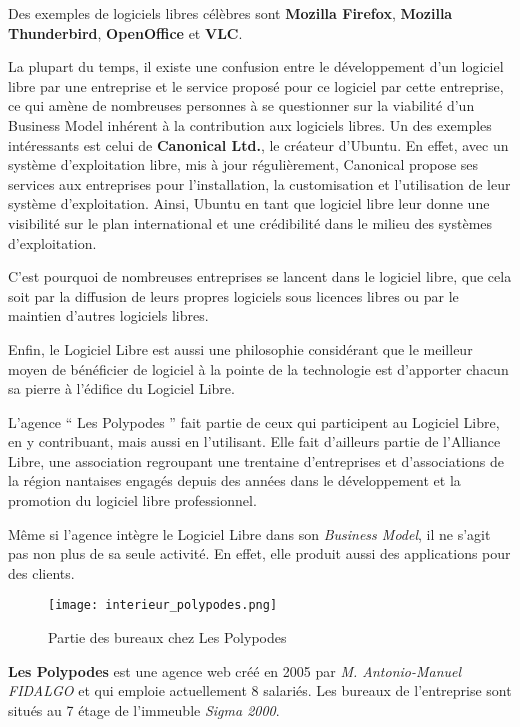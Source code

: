 Des exemples de logiciels libres célèbres sont \textbf{Mozilla Firefox}, \textbf{Mozilla Thunderbird}, \textbf{OpenOffice} et \textbf{VLC}.

\vspace{1cm}

La plupart du temps, il existe une confusion entre le développement d'un logiciel libre par une entreprise et le service proposé pour ce logiciel par cette entreprise, ce qui amène de nombreuses personnes à se questionner sur la viabilité d'un Business Model inhérent à la contribution aux logiciels libres. Un des exemples intéressants est celui de \textbf{Canonical Ltd.}, le créateur d'Ubuntu. En effet, avec un système d'exploitation libre, mis à jour régulièrement, Canonical propose ses services aux entreprises pour l'installation, la customisation et l'utilisation de leur système d'exploitation. Ainsi, Ubuntu en tant que logiciel libre leur donne une visibilité sur le plan international et une crédibilité dans le milieu des systèmes d'exploitation.

C'est pourquoi de nombreuses entreprises se lancent dans le logiciel libre, que cela soit par la diffusion de leurs propres logiciels sous licences libres ou par le maintien d'autres logiciels libres.

Enfin, le Logiciel Libre est aussi une philosophie considérant que le meilleur moyen de bénéficier de logiciel à la pointe de la technologie est d'apporter chacun sa pierre à l'édifice du Logiciel Libre.

L'agence `` Les Polypodes '' fait partie de ceux qui participent au Logiciel Libre, en y contribuant, mais aussi en l'utilisant. Elle fait d'ailleurs partie de l'Alliance Libre, une association regroupant une trentaine d'entreprises et d'associations de la région nantaises engagés depuis des années dans le développement et la promotion du logiciel libre professionnel.

Même si l'agence intègre le Logiciel Libre dans son \textit{Business Model}, il ne s'agit pas non plus de sa seule activité. En effet, elle produit aussi des applications pour des clients.

\begin{figure}[H]
\begin{center}
\texttt{[image: interieur\_polypodes.png]}
\end{center}
\caption{Partie des bureaux chez Les Polypodes}
\end{figure}

\textbf{Les Polypodes} est une agence web créé en 2005 par \textit{M. Antonio-Manuel FIDALGO} et qui emploie actuellement 8 salariés. Les bureaux de l'entreprise sont situés au 7 étage de l'immeuble \textit{Sigma 2000}.

